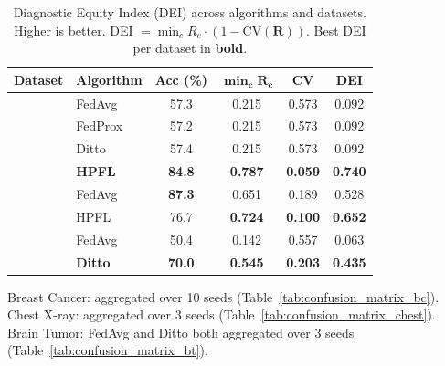 \documentclass[conference]{IEEEtran}
\begin{document}
\begin{table}[htbp]
\centering
\caption{Diagnostic Equity Index (DEI) across algorithms and datasets. Higher is better. DEI $= \min_c R_c \cdot (1 - \text{CV}(\mathbf{R}))$. Best DEI per dataset in \textbf{bold}.}
\label{tab:dei_results}
\small
\begin{tabular}{llcccc}
\toprule
\textbf{Dataset} & \textbf{Algorithm} & \textbf{Acc (\%)} & $\boldsymbol{\min_c R_c}$ & \textbf{CV} & \textbf{DEI} \\
\midrule
{} & FedAvg & 57.3 & 0.215 & 0.573 & 0.092 \\
 & FedProx & 57.2 & 0.215 & 0.573 & 0.092 \\
 & Ditto & 57.4 & 0.215 & 0.573 & 0.092 \\
 & \textbf{HPFL} & \textbf{84.8} & \textbf{0.787} & \textbf{0.059} & \textbf{0.740} \\
\midrule
{} & FedAvg & \textbf{87.3} & 0.651 & 0.189 & 0.528 \\
 & HPFL & 76.7 & \textbf{0.724} & \textbf{0.100} & \textbf{0.652} \\
\midrule
{} & FedAvg & 50.4 & 0.142 & 0.557 & 0.063 \\
 & \textbf{Ditto} & \textbf{70.0} & \textbf{0.545} & \textbf{0.203} & \textbf{0.435} \\
\bottomrule
\end{tabular}

\vspace{1mm}
\footnotesize{Breast Cancer: aggregated over 10 seeds (Table~\ref{tab:confusion_matrix_bc}). Chest X-ray: aggregated over 3 seeds (Table~\ref{tab:confusion_matrix_chest}). Brain Tumor: FedAvg and Ditto both aggregated over 3 seeds (Table~\ref{tab:confusion_matrix_bt}).}
\end{table}
\end{document}
